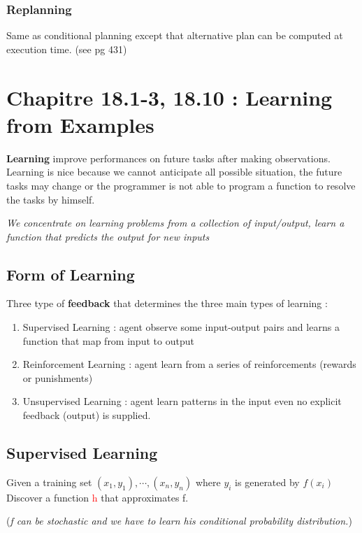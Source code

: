 \subsubsection{Replanning}
Same  as  conditional  planning  except that  alternative  plan  can  be
computed at execution time. (see pg 431)

\section{Chapitre 18.1-3, 18.10 : Learning from Examples }
\textbf{Learning} improve performances on future tasks after making observations. Learning is nice because we cannot anticipate
all possible situation, the future tasks may change or the programmer is not able to program a function to resolve the tasks by himself.

\textit{We concentrate on learning problems from a collection of input/output,
learn a function that predicts the output for new inputs}

\subsection{Form of Learning}

Three type of \textbf{feedback} that determines the three main types of learning :
\begin{enumerate}
    \item Supervised Learning : agent observe some input-output pairs and learns
        a function that map from input to output
    \item Reinforcement Learning : agent learn from a series of reinforcements
        (rewards or punishments)
    \item Unsupervised Learning : agent learn patterns in the input
        even no explicit feedback (output) is supplied.
\end{enumerate}

\subsection{Supervised Learning}

Given a training set $(x_1, y_1),\cdots, (x_n, y_n)$ where $y_i$ is generated by $f(x_i)$
Discover a function \textcolor{red}{h} that approximates f.

(\textit{f can be stochastic and we have to learn his conditional probability distribution.})

